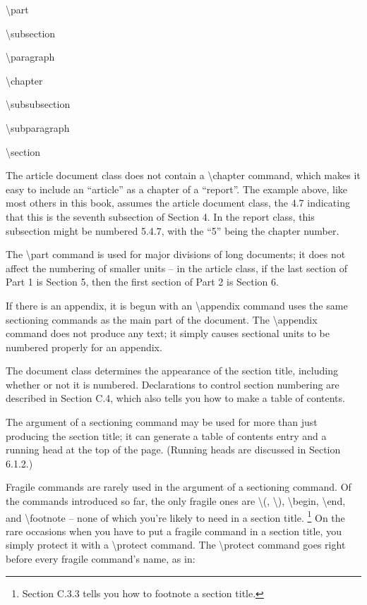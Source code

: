 \documentclass[twocolumn]{article}        %
\begin{document}
\textbackslash part 

\textbackslash subsection 

\textbackslash paragraph

\textbackslash chapter 

\textbackslash subsubsection 

\textbackslash subparagraph

\textbackslash section 

The article document class does not contain a \textbackslash chapter command, which makes it easy to include an 
``article'' as a chapter of a ``report''. The example above, like most others in this book, assumes the article
document class, the 4.7 indicating that this is the seventh subsection of Section 4. In the report class, 
this subsection might be numbered 5.4.7, with the ``5'' being the chapter number.

The \textbackslash part command is used for major divisions of long documents; it does not affect the numbering
of smaller units -- in the article class, if the last section of Part 1 is Section 5, then the first section of
Part 2 is Section 6.

If there is an appendix, it is begun with an \textbackslash appendix command uses the same sectioning commands
as the main part of the document. The \textbackslash appendix command does not produce any text; it simply causes
sectional units to be numbered properly for an appendix.

The document class determines the appearance of the section title, including whether or not it is numbered. 
Declarations to control section numbering are described in Section C.4, which also tells you how to make a 
table of contents.

The argument of a sectioning command may be used for more than just producing the section title; it can generate 
a table of contents entry and a running head at the top of the page. (Running heads are discussed in Section 6.1.2.)

Fragile commands are rarely used in the argument of a sectioning command. Of the commands introduced so far, the only
fragile ones are \textbackslash (, \textbackslash ),  \textbackslash begin, \textbackslash end,  and 
\textbackslash footnote -- none of which you're likely to need in a section title.
\footnote{Section C.3.3 tells you how to footnote a section title.}
On the rare occasions when you have to put a fragile command in a section title, you simply protect it with a 
\textbackslash protect command.
The \textbackslash protect command goes right before every fragile command's name, as in:
\end{document}
